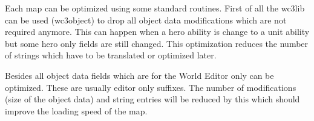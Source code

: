 \documentclass[a4paper,12pt,titlepage]{report}
\begin{document}
Each map can be optimized using some standard routines. First of all the wc3lib can be used (wc3object) to drop all object data modifications which are not required anymore. This can happen when a hero ability is change to a unit ability but some hero only fields are still changed. This optimization reduces the number of strings which have to be translated or optimized later.

\vspace{\baselineskip}

Besides all object data fields which are for the World Editor only can be optimized. These are usually editor only suffixes. The number of modifications (size of the object data) and string entries will be reduced by this which should improve the loading speed of the map.

\newpage

\cleardoublepage
{}
{}
\listoffigures

\newpage

%

\cleardoublepage
{}
{}
\renewcommand\lstlistingname{Listings}
\renewcommand\lstlistlistingname{Listings}
\lstlistoflistings

\newpage

\setcounter{biburlnumpenalty}{9000}
\setcounter{biburlucpenalty}{9000}
\setcounter{biburllcpenalty}{9000}
\cleardoublepage
{}
{}
\printbibliography[title=Bibliography]
\end{document}
